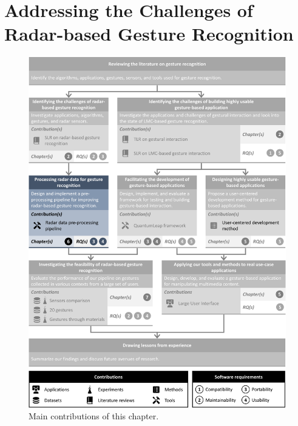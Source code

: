 \chapter{Addressing the Challenges of Radar-based Gesture Recognition} \label{chap:radar-challenges}

\begin{figure}
    \centering
    \includegraphics[width=\linewidth]{Figures/RadarChallenges/graphical-summary-radar-challenges.pdf}
    \vspace{-18pt}
    \caption{Main contributions of this chapter.}
    \label{fig:radar-challenges:graphical-summary}
\end{figure}

